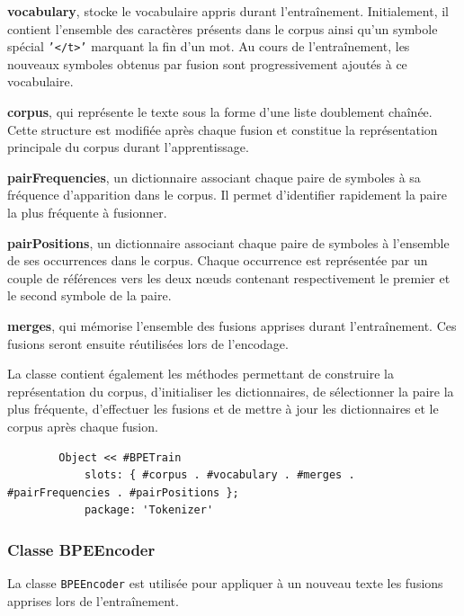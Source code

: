 \documentclass[12pt,a4paper]{report}
\begin{document}
	\begin{itemizeFB}
		\item \textbf{vocabulary}, stocke le vocabulaire appris durant l’entraînement. Initialement, il contient l’ensemble des caractères présents dans le corpus ainsi qu’un symbole spécial \texttt{'</t>'} marquant la fin d’un mot. Au cours de l’entraînement, les nouveaux symboles obtenus par fusion sont progressivement ajoutés à ce vocabulaire.
		
		\item \textbf{corpus}, qui représente le texte sous la forme d'une liste doublement chaînée. Cette structure est modifiée après chaque fusion et constitue la représentation principale du corpus durant l'apprentissage.
		
		\item \textbf{pairFrequencies}, un dictionnaire associant chaque paire de symboles à sa fréquence d'apparition dans le corpus. Il permet d'identifier rapidement la paire la plus fréquente à fusionner.
		
		\item \textbf{pairPositions}, un dictionnaire associant chaque paire de symboles à l'ensemble de ses occurrences dans le corpus. Chaque occurrence est représentée par un couple de références vers les deux nœuds contenant respectivement le premier et le second symbole de la paire.
		
		\item \textbf{merges}, qui mémorise l'ensemble des fusions apprises durant l'entraînement. Ces fusions seront ensuite réutilisées lors de l'encodage.
	\end{itemizeFB}
	
	La classe contient également les méthodes permettant de construire la représentation du corpus, d'initialiser les dictionnaires, de sélectionner la paire la plus fréquente, d'effectuer les fusions et de mettre à jour les dictionnaires et le corpus après chaque fusion.
	
	\begin{verbatim}
		Object << #BPETrain	
			slots: { #corpus . #vocabulary . #merges . #pairFrequencies . #pairPositions };	
			package: 'Tokenizer'
	\end{verbatim}
	
	\subsubsection{Classe BPEEncoder}
	
	La classe \texttt{BPEEncoder} est utilisée pour appliquer à un nouveau texte les fusions apprises lors de l'entraînement.
	
\end{document}
